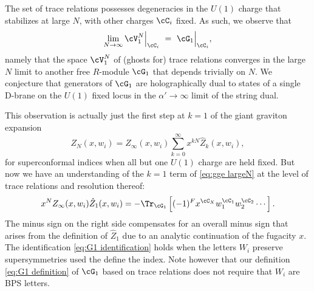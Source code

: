 \documentclass[a4paper,12pt]{article}
\begin{document}
The set of trace relations possesses degeneracies in the $U(1)$ charge that stabilizes at large $N$, with other charges $\cC_i$ fixed. As such, we observe that
\begin{equation} \label{eq:G1 definition}
\lim_{N \to \infty} \cV_{1}^N \Big\rvert_{\cC_i} \ = \ \cG_{1} \Big\rvert_{\cC_i},
\end{equation}
namely that the space $\cV_{1}^N$ of (ghosts for) trace relations converges in the large $N$ limit to another free $R$-module $\cG_{1}$ that depends trivially on $N$. We conjecture that generators of $\cG_{1}$ are holographically dual to states of a single D-brane on the $U(1)$ fixed locus in the $\alpha' \to \infty$ limit of the string dual.

This observation is actually just the first step at $k=1$ of the giant graviton expansion \cite{Gaiotto:2021xce}
\begin{equation} \label{eq:gge largeN}
Z_N(x, w_i) = Z_\infty(x, w_i) \sum_{k=0}^\infty x^{k N} \hat{Z}_k(x,w_i),
\end{equation}
for superconformal indices when all but one $U(1)$ charge are held fixed. But now we have an understanding of the $k=1$ term of \eqref{eq:gge largeN} at the level of trace relations and resolution thereof:
\begin{equation} \label{eq:G1 identification}
x^{N} Z_\infty(x, w_i) \hat{Z}_{1}(x,w_i) = -\Tr_{\cG_{1}} \left[ (-1)^F x^{\cC_X} w_1^{\cC_1} w_2^{\cC_2} \cdots \right].
\end{equation}
The minus sign on the right side compensates for an overall minus sign that arises from the definition of $\hat{Z}_{1}$ due to an analytic continuation of the fugacity $x$. The identification \eqref{eq:G1 identification} holds when the letters $W_i$ preserve supersymmetries used the define the index. Note however that our definition \eqref{eq:G1 definition} of $\cG_1$ based on trace relations does not require that $W_i$ are BPS letters.
\end{document}
